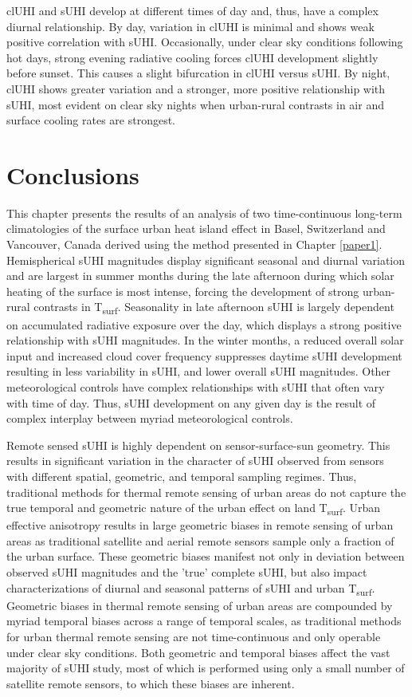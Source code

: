 \begin{bibunit}
clUHI and sUHI develop at different times of day and, thus, have a complex diurnal relationship. By day, variation in clUHI is minimal and shows weak positive correlation with sUHI. Occasionally, under clear sky conditions following hot days, strong evening radiative cooling forces clUHI development slightly before sunset. This causes a slight bifurcation in clUHI versus sUHI. By night, clUHI shows greater variation and a stronger, more positive relationship with sUHI, most evident on clear sky nights when urban-rural contrasts in air and surface cooling rates are strongest. 

\section{Conclusions}

This chapter presents the results of an analysis of two time-continuous long-term climatologies of the surface urban heat island effect in Basel, Switzerland and Vancouver, Canada derived using the method presented in Chapter \ref{paper1}. Hemispherical sUHI magnitudes display significant seasonal and diurnal variation and are largest in summer months during the late afternoon during which solar heating of the surface is most intense, forcing the development of strong urban-rural contrasts in T\textsubscript{surf}. Seasonality in late afternoon sUHI is largely dependent on accumulated radiative exposure over the day, which displays a strong positive relationship with sUHI magnitudes. In the winter months, a reduced overall solar input and increased cloud cover frequency suppresses daytime sUHI development resulting in less variability in sUHI, and lower overall sUHI magnitudes. Other meteorological controls have complex relationships with sUHI that often vary with time of day. Thus, sUHI development on any given day is the result of complex interplay between myriad meteorological controls. 

Remote sensed sUHI is highly dependent on sensor-surface-sun geometry. This results in significant variation in the character of sUHI observed from sensors with different spatial, geometric, and temporal sampling regimes. Thus, traditional methods for thermal remote sensing of urban areas do not capture the true temporal and geometric nature of the urban effect on land T\textsubscript{surf}. Urban effective anisotropy results in large geometric biases in remote sensing of urban areas as traditional satellite and aerial remote sensors sample only a fraction of the urban surface. These geometric biases manifest not only in deviation between observed sUHI magnitudes and the 'true' complete sUHI, but also impact characterizations of diurnal and seasonal patterns of sUHI and urban T\textsubscript{surf}. Geometric biases in thermal remote sensing of urban areas are compounded by myriad temporal biases across a range of temporal scales, as traditional methods for urban thermal remote sensing are not time-continuous and only operable under clear sky conditions. Both geometric and temporal biases affect the vast majority of sUHI study, most of which is performed using only a small number of satellite remote sensors, to which these biases are inherent.


\end{bibunit}

